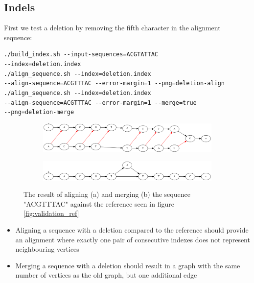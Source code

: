\documentclass[thesis.tex]{subfiles}
\begin{document}
\subsection*{Indels}
First we test a deletion by removing the fifth character in the alignment sequence:\\
\par\noindent
\texttt{./build\_index.sh -{}-input-sequences=ACGTATTAC \\
-{}-index=deletion.index}\\
\texttt{./align\_sequence.sh -{}-index=deletion.index \\
-{}-align-sequence=ACGTTTAC -{}-error-margin=1 -{}-png=deletion-align}\\
\texttt{./align\_sequence.sh -{}-index=deletion.index \\
-{}-align-sequence=ACGTTTAC -{}-error-margin=1 -{}-merge=true \\
-{}-png=deletion-merge}\\
\begin{figure}[!h]
  \begin{mdframed}
  \begin{subfigure}[t]{\textwidth}
      \includegraphics[width=\textwidth]{output/deletion-align.png}
    \subcaption{}
  \end{subfigure}
  \begin{subfigure}[t]{\textwidth}
      \includegraphics[width=\textwidth]{output/deletion-merge.png}
    \subcaption{}
  \end{subfigure}
  \end{mdframed}
  \caption[Aligning and merging a deletion with \ref{fig:validation_ref}]{The result of aligning (a) and merging (b) the sequence "ACGTTTAC" against the reference seen in figure \ref{fig:validation_ref}}
  \label{fig:validation_deletion}
\end{figure}
\begin{itemize}
\item Aligning a sequence with a deletion compared to the reference should provide an alignment where exactly one pair of consecutive indexes does not represent neighbouring vertices
\item Merging a sequence with a deletion should result in a graph with the same number of vertices as the old graph, but one additional edge
\end{itemize}
\end{document}
